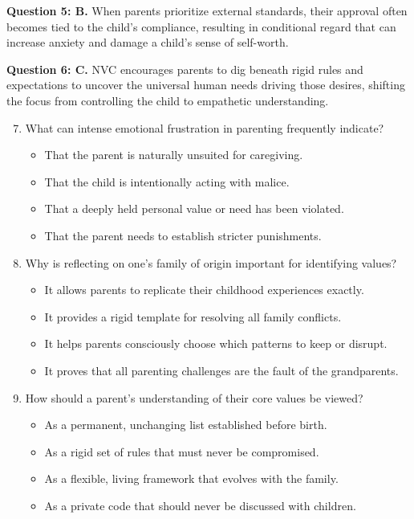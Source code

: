 \begin{practiceexercise}
\textbf{Question 5: B.} When parents prioritize external standards, their approval often becomes tied to the child's compliance, resulting in conditional regard that can increase anxiety and damage a child's sense of self-worth.
\vspace{\fill}

\textbf{Question 6: C.} NVC encourages parents to dig beneath rigid rules and expectations to uncover the universal human needs driving those desires, shifting the focus from controlling the child to empathetic understanding.
\vspace{\fill}
\newpage

\begin{enumerate}
  \setcounter{enumi}{6}
  \item What can intense emotional frustration in parenting frequently indicate?
    \begin{itemize}
      \item[A)] That the parent is naturally unsuited for caregiving.
      \item[B)] That the child is intentionally acting with malice.
      \item[C)] That a deeply held personal value or need has been violated.
      \item[D)] That the parent needs to establish stricter punishments.
    \end{itemize}
  \vspace{\fill}
  \item Why is reflecting on one's family of origin important for identifying values?
    \begin{itemize}
      \item[A)] It allows parents to replicate their childhood experiences exactly.
      \item[B)] It provides a rigid template for resolving all family conflicts.
      \item[C)] It helps parents consciously choose which patterns to keep or disrupt.
      \item[D)] It proves that all parenting challenges are the fault of the grandparents.
    \end{itemize}
  \vspace{\fill}
  \item How should a parent's understanding of their core values be viewed?
    \begin{itemize}
      \item[A)] As a permanent, unchanging list established before birth.
      \item[B)] As a rigid set of rules that must never be compromised.
      \item[C)] As a flexible, living framework that evolves with the family.
      \item[D)] As a private code that should never be discussed with children.
    \end{itemize}
\end{enumerate}
\vspace{\fill}


\end{practiceexercise}
